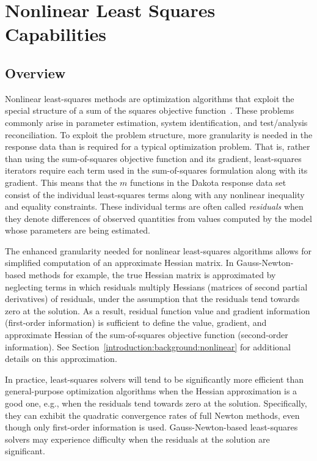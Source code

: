 \chapter{Nonlinear Least Squares Capabilities}\label{nls}

\section{Overview}\label{nls:overview}

Nonlinear least-squares methods are optimization algorithms that
exploit the special structure of a sum of the squares objective
function~\cite{Gil81}. These problems commonly arise in parameter
estimation, system identification, and test/analysis reconciliation.
To exploit the problem structure, more granularity is needed
in the response data than is required for a typical optimization
problem.  That is, rather than using the sum-of-squares objective
function and its gradient, least-squares iterators require each term
used in the sum-of-squares formulation along with its gradient. This
means that the $m$ functions in the Dakota response data set consist
of the individual least-squares terms along with any nonlinear
inequality and equality constraints. These individual terms are often
called \emph{residuals} when they denote differences of
observed quantities from values computed by the model whose parameters
are being estimated.

The enhanced granularity needed for nonlinear least-squares algorithms
allows for simplified computation of an approximate Hessian matrix.
In Gauss-Newton-based methods for example, the true Hessian matrix is
approximated by neglecting terms in which residuals multiply
Hessians (matrices of second
partial derivatives) of residuals,
under the assumption that the residuals tend towards zero at
the solution. As a result, residual function value and gradient
information (first-order information) is sufficient to define the
value, gradient, and approximate Hessian of the sum-of-squares
objective function (second-order information). See
Section~\ref{introduction:background:nonlinear} for additional details
on this approximation.

In practice, least-squares solvers will tend to be significantly more
efficient than general-purpose optimization algorithms when the
Hessian approximation is a good one, e.g., when the residuals tend
towards zero at the solution. Specifically, they can exhibit the
quadratic convergence rates of full Newton methods, even though only
first-order information is used. Gauss-Newton-based least-squares
solvers may experience difficulty when the residuals at the solution
are significant.

